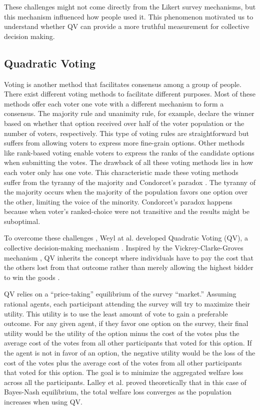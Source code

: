 These challenges might not come directly from the Likert survey mechanisms, but this mechanism influenced how people used it. This phenomenon motivated us to understand whether QV can provide a more truthful measurement for collective decision making.\par

\subsection{Quadratic Voting}
Voting is another method that facilitates consensus among a group of people. There exist different voting methods to facilitate different purposes. Most of these methods offer each voter one vote with a different mechanism to form a consensus. The majority rule and unanimity rule, for example, declare the winner based on whether that option received over half of the voter population or the number of voters, respectively. This type of voting rules are straightforward but suffers from allowing voters to express more fine-grain options\cite{sep-voting-methods}. Other methods like rank-based voting enable voters to express the ranks of the candidate options when submitting the votes. The drawback of all these voting methods lies in how each voter only has one vote. This characteristic made these voting methods suffer from the tyranny of the majority and Condorcet's paradox \cite{sep-voting-methods}. The tyranny of the majority occurs when the majority of the population favors one option over the other, limiting the voice of the minority. Condorcet's paradox happens because when voter's ranked-choice were not transitive and the results might be suboptimal.

To overcome these challenges \cite{posner2018radical}, Weyl at al. developed Quadratic Voting (QV), a collective decision-making mechanism \cite{lalley2018quadratic}. Inspired by the Vickrey-Clarke-Groves mechanism \cite{roughgarden2010algorithmic}, QV inherits the concept where individuals have to pay the cost that the others lost from that outcome rather than merely allowing the highest bidder to win the goods \cite{posner2018radical}. \par

QV relies on a ``price-taking'' equilibrium of the survey ``market.'' Assuming rational agents, each participant attending the survey will try to maximize their utility. This utility is to use the least amount of vote to gain a preferable outcome. For any given agent, if they favor one option on the survey, their final utility would be the utility of the option minus the cost of the votes plus the average cost of the votes from all other participants that voted for this option. If the agent is not in favor of an option, the negative utility would be the loss of the cost of the votes plus the average cost of the votes from all other participants that voted for this option. The goal is to minimize the aggregated welfare loss across all the participants. Lalley et al. \cite{lalley2018quadratic} proved theoretically that in this case of Bayes-Nash equilibrium, the total welfare loss converges as the population increases when using QV.\par

